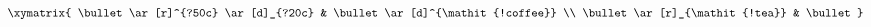 $\xymatrix{
    \bullet \ar[r]^{?50c} \ar[d]_{?20c} & \bullet \ar[d]^{\mathit{!coffee}} \\
    \bullet \ar[r]_{\mathit{!tea}}       & \bullet }$
